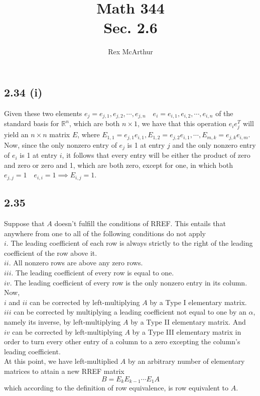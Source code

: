 \documentclass[letterpaper,12pt]{article}
\theoremstyle{definition}
\begin{document}
\title{Math 344\\ Sec. 2.6}
\author{Rex McArthur}
\maketitle

\subsection*{2.34 (i)}
Given these two elements $e_j = {e_{j,1}, e_{j,2}, \cdots, e_{j,n}} \quad e_i = {e_{i,1}, e_{i,2}, \cdots, e_{i,n}}$ of the standard basis for $\mathbb{R} ^n$, which are both $n \times 1$, we have that this operation $e_ie_j^T$ will yield an $n \times n$ matrix $E$, where $E_{1,1} = e_{j,1}e_{i,1}, E_{1,2} = e_{j,2}e_{i,1}, \cdots, E_{m,k} = e_{j,k}e_{i,m}$. Now, since the only nonzero entry of $e_j$ is 1 at entry $j$ and the only nonzero entry of $e_i$ is 1 at entry $i$, it follows that every entry will be either the product of zero and zero or zero and 1, which are both zero, except for one, in which both $e_{j,j} = 1 \quad e_{i,i} = 1 \implies E_{i,j} = 1$.

\subsection*{2.35}
Suppose that $A$ doesn't fulfill the conditions of RREF. This entails that anywhere from one to all of the following conditions do not apply
\\$i$. The leading coefficient of each row is always strictly to the right of the leading coefficient of the row above it.
\\$ii$. All nonzero rows are above any zero rows.
\\$iii$. The leading coefficient of every row is equal to one.
\\$iv$. The leading coefficient of every row is the only nonzero entry in its column. 
Now, \\$i$ and $ii$ can be corrected by left-multiplying $A$ by a Type I elementary matrix. \\$iii$ can be corrected by multiplying a leading coefficient not equal to one by an $\alpha$, namely its inverse, by left-multiplying $A$ by a Type II elementary matrix. And \\$iv$ can be corrected by left-multiplying $A$ by a Type III elementary matrix in order to turn every other entry of a column to a zero excepting the column's leading coefficient.
\\At this point, we have left-multiplied $A$ by an arbitrary number of elementary matrices to attain a new RREF matrix \[B = E_kE_{k-1}\cdots E_1A\]which according to the definition of row equivalence, is row equivalent to $A$. 
\end{document}
